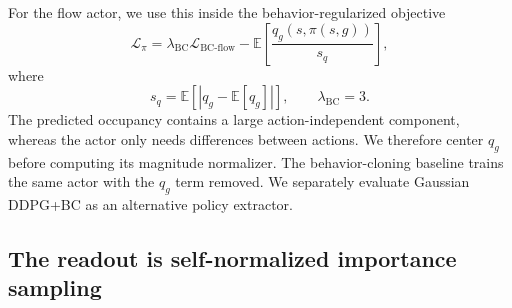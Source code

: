 \documentclass{article}
\newcommand{\E}{\mathbb{E}}
\begin{document}
For the flow actor, we use this inside the behavior-regularized objective
\begin{equation}
\label{eq:actor}
    \mathcal L_\pi = \lambda_{\mathrm{BC}} \mathcal L_{\mathrm{BC\text{-}flow}} - \E\left[ \frac{ q_g(s,\pi(s,g)) }{s_q} \right],
\end{equation}
where
\begin{equation}
    s_q = \E\left[ \left| q_g-\E[q_g] \right| \right], \qquad \lambda_{\mathrm{BC}}=3.
\end{equation}
The predicted occupancy contains a large action-independent component, whereas the actor only needs differences between actions.
We therefore center $q_g$ before computing its magnitude normalizer.
The behavior-cloning baseline trains the same actor with the $q_g$ term removed.
We separately evaluate Gaussian DDPG+BC as an alternative policy extractor.

\subsection{The readout is self-normalized importance sampling}
\label{sec:snis}
\end{document}
